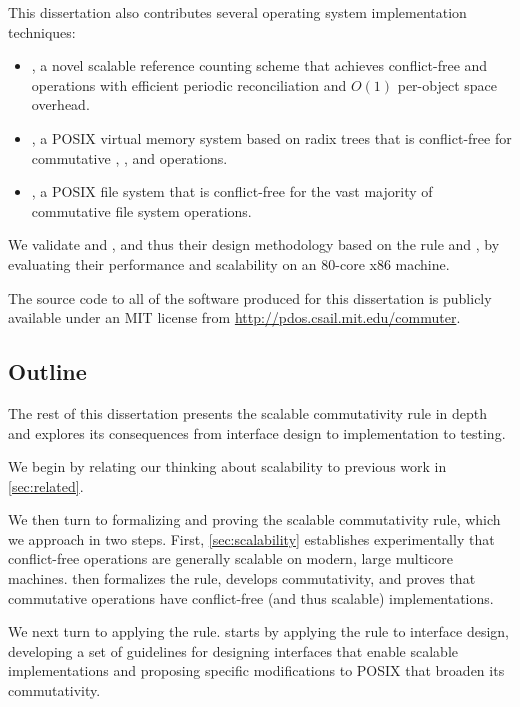 \noindent
This dissertation also contributes several operating system
implementation techniques:

\begin{itemize}

\item {}, a novel scalable reference counting scheme that
  achieves conflict-free  and 
  operations with efficient periodic reconciliation and $O(1)$
  per-object space overhead.

\item \vm, a POSIX virtual memory system based on radix trees that is
  conflict-free for commutative , , and
   operations.

\item \fs, a POSIX file system that is conflict-free for the vast
  majority of commutative file system operations.

\end{itemize}

\noindent
We validate \vm and \fs, and thus their design methodology based on
the rule and \tool, by evaluating their performance and scalability on
an 80-core x86 machine.

The source code to all of the software produced for this dissertation
is publicly available under an MIT license from
\url{http://pdos.csail.mit.edu/commuter}.


\subsection{Outline}

The rest of this dissertation presents the scalable commutativity rule
in depth and explores its consequences from interface design to
implementation to testing.

We begin by relating our thinking about scalability to previous work
in \cref{sec:related}.

We then turn to formalizing and proving the scalable commutativity
rule, which we approach in two steps.  First, \cref{sec:scalability}
establishes experimentally that conflict-free operations are generally
scalable on modern, large multicore machines.   then
formalizes the rule, develops \SIM commutativity, and proves that
commutative operations have conflict-free (and thus scalable)
implementations.

We next turn to applying the rule.   starts by
applying the rule to interface design, developing a set of guidelines
for designing interfaces that enable scalable implementations and
proposing specific modifications to POSIX that broaden its
commutativity.

